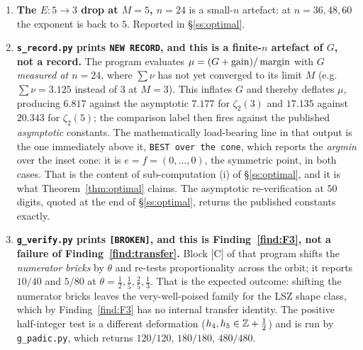 \begin{enumerate}[label=\textup{(\alph*)},leftmargin=2.6em,itemsep=4pt]
\item \textbf{The $E:5\to3$ drop at $M=5$, $n=24$} is a small-$n$ artefact: at
      $n=36,48,60$ the exponent is back to $5$. Reported in \S\ref{ss:optimal}.

\item \textbf{\texttt{s\_record.py} prints \texttt{NEW RECORD}, and this is a finite-$n$
      artefact of $G$, not a record.} The program evaluates $\mu=(G+\mathrm{gain})/\operatorname{margin}$
      with $G$ \emph{measured at $n=24$}, where $\sum\nu$ has not yet converged to its limit
      $M$ (e.g.\ $\sum\nu=3.125$ instead of $3$ at $M=3$). This inflates $G$ and thereby
      deflates $\mu$, producing $6.817$ against the asymptotic $7.177$ for $\zeta_2(3)$ and
      $17.135$ against $20.343$ for $\zeta_2(5)$; the comparison label then fires against the
      published \emph{asymptotic} constants. The mathematically load-bearing line in that
      output is the one immediately above it, \texttt{BEST over the cone}, which reports the
      \emph{argmin} over the inset cone: it is $e=f=(0,\dots,0)$, the symmetric point, in
      both cases. That is the content of sub-computation (i) of \S\ref{ss:optimal}, and it is
      what Theorem~\ref{thm:optimal} claims. The asymptotic re-verification at $50$ digits,
      quoted at the end of \S\ref{ss:optimal}, returns the published constants exactly.

\item \textbf{\texttt{g\_verify.py} prints \texttt{[BROKEN]}, and this is
      Finding~\ref{find:F3}, not a failure of Finding~\ref{find:transfer}.} Block
      \textup{[C]} of that program shifts the \emph{numerator bricks} by $\theta$ and
      re-tests proportionality across the orbit; it reports $10/40$ and $5/80$ at
      $\theta=\tfrac12,\tfrac15,\tfrac25,\tfrac13$. That is the expected outcome: shifting
      the numerator bricks leaves the very-well-poised family for the LSZ shape class, which
      by Finding~\ref{find:F3} has no internal transfer identity. The positive
      half-integer test is a different deformation ($h_4,h_5\in\mathbb{Z}+\tfrac12$) and is run by
      \texttt{g\_padic.py}, which returns $120/120$, $180/180$, $480/480$.


\end{enumerate}
